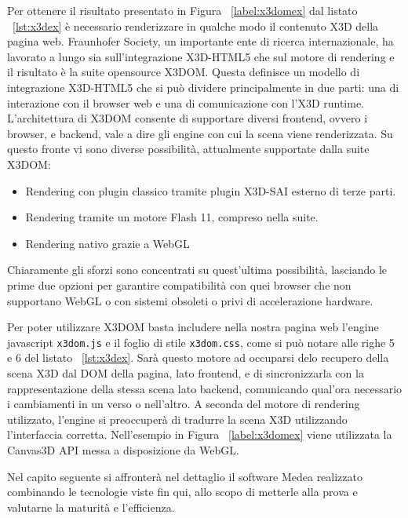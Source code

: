 Per ottenere il risultato presentato in Figura ~\ref{label:x3domex} dal listato ~\ref{lst:x3dex} è necessario renderizzare in qualche modo il contenuto X3D della pagina web. 
Fraunhofer Society, un importante ente di ricerca internazionale, ha lavorato a lungo sia sull'integrazione X3D-HTML5 che sul motore di rendering e il risultato è la suite opensource X3DOM. Questa definisce un modello di integrazione X3D-HTML5 che si può dividere principalmente in due parti: una di interazione con il browser web e una di comunicazione con l'X3D runtime. L'architettura di X3DOM consente di supportare diversi frontend, ovvero i browser, e backend, vale a dire gli engine con cui la scena viene renderizzata. Su questo fronte vi sono diverse possibilità, attualmente supportate dalla suite X3DOM: 
\begin{itemize}
	\item Rendering con plugin classico tramite plugin X3D-SAI esterno di terze parti.
	\item Rendering tramite un motore Flash 11, compreso nella suite.
    \item Rendering nativo grazie a WebGL
\end{itemize}
Chiaramente gli sforzi sono concentrati su quest'ultima possibilità, lasciando le prime due opzioni per garantire compatibilità con quei browser che non supportano WebGL o con sistemi obsoleti o privi di accelerazione hardware.

Per poter utilizzare X3DOM basta includere nella nostra pagina web l'engine javascript \texttt{x3dom.js} e il foglio di stile \texttt{x3dom.css}, come si può notare alle righe 5 e 6 del listato ~\ref{lst:x3dex}. Sarà questo motore ad occuparsi delo recupero della scena X3D dal DOM della pagina, lato frontend, e di sincronizzarla con la rappresentazione della stessa scena lato backend, comunicando qual'ora necessario i cambiamenti in un verso o nell'altro. A seconda del motore di rendering utilizzato, l'engine si preoccuperà di tradurre la scena X3D utilizzando l'interfaccia corretta. Nell'esempio in Figura ~\ref{label:x3domex} viene utilizzata la Canvas3D API messa a disposizione da WebGL.

Nel capito seguente si affronterà nel dettaglio il software Medea realizzato combinando le tecnologie viste fin qui, allo scopo di metterle alla prova e valutarne la maturità e l'efficienza.
